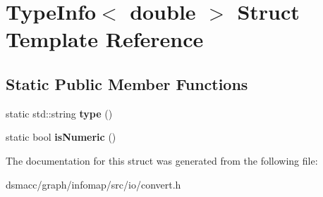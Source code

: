 \hypertarget{structTypeInfo_3_01double_01_4}{}\section{Type\+Info$<$ double $>$ Struct Template Reference}
\label{structTypeInfo_3_01double_01_4}
\subsection*{Static Public Member Functions}
\begin{DoxyCompactItemize}
\item 
\mbox{\label{structTypeInfo_3_01double_01_4_abdcf02876fa65d284a38444bf7fdfdac}} 
static std\+::string {\bfseries type} ()
\item 
\mbox{\label{structTypeInfo_3_01double_01_4_a951407c79322c96bda2438a0650d1522}} 
static bool {\bfseries is\+Numeric} ()
\end{DoxyCompactItemize}


The documentation for this struct was generated from the following file\+:\begin{DoxyCompactItemize}
\item 
dsmacc/graph/infomap/src/io/convert.\+h\end{DoxyCompactItemize}
